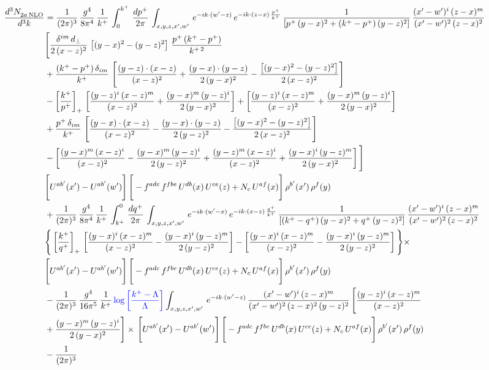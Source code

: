\documentclass[9pt]{article}
\numberwithin{equation}{section}
\begin{document}
\begin{align}
    \frac{d^{3}N_{2a\,\rm NLO}^{\rm}}{d^{3}k}  & =  \frac{1}{(2\pi)^{3}}\, \frac{g^{4}}{8\pi^{4}}\,\frac{1}{k^{+}}\,\int_{0}^{k^{+}}\, \frac{dp^{+}}{2\pi}\,\int_{x,y,z,x',w'}\, e^{-ik\cdot(w'-z)}\,e^{-ik\cdot (z-x)\,\frac{p^{+}}{k^{+}}}\,\frac{1}{\left[p^{+}\,(y-x)^{2}+(k^{+}-p^{+})\,(y-z)^{2}\right]}\, \frac{(x'-w')^{i}\,(z-x)^{m}}{(x'-w')^{2}\,(z-x)^{2}} \notag \\ & \Bigg[\frac{\delta^{im}\,d_{\perp}}{2\,(x-z)^{2}}\,\left[(y-x)^{2}-(y-z)^{2}\right]\,\frac{p^{+}\,(k^{+}-p^{+})}{k^{+\,2}}\notag \\ & +\frac{(k^{+}-p^{+})\,\delta_{im}}{k^{+}}\,\left[\frac{(y-z)\cdot (x-z)}{(x-z)^{2}}+\frac{(y-x)\cdot (y-z)}{2\,(y-x)^{2}}-\frac{\left[(y-x)^{2}-(y-z)^{2}\right]}{2\,(x-z)^{2}}\right]\notag \\ & -\left[\frac{k^{+}}{p^{+}}\right]_{+}\,\left[\frac{(y-z)^{i}\,(x-z)^{m}}{(x-z)^{2}}+\frac{(y-x)^{m}\,(y-z)^{i}}{2\,(y-x)^{2}}\right]+ \left[\frac{(y-z)^{i}\,(x-z)^{m}}{(x-z)^{2}}+\frac{(y-x)^{m}\,(y-z)^{i}}{2\,(y-x)^{2}}\right]\notag \\ & +\frac{p^{+}\,\delta_{im}}{k^{+}}\,\left[\frac{(y-x)\cdot (x-z)}{(x-z)^{2}}-\frac{(y-x)\cdot (y-z)}{2\,(y-z)^{2}}-\frac{\left[(y-x)^{2}-(y-z)^{2}\right]}{2\,(x-z)^{2}}\right]\notag \\ &-\left[\frac{(y-x)^{m}\,(x-z)^{i}}{(x-z)^{2}}-\frac{(y-x)^{m}\,(y-z)^{i}}{2\,(y-z)^{2}}+\frac{(y-z)^{m}\,(x-z)^{i}}{(x-z)^{2}}+\frac{(y-x)^{i}\,(y-z)^{m}}{2\,(y-x)^{2}}\right]\Bigg]\, \notag \\ & \Bigg[U^{ab'}(x')-U^{ab'}(w')\Bigg]\,\Bigg[-f^{adc}\,f^{fbe}\,U^{db}(x)\,U^{ce}(z)+N_{c}\,U^{af}(x)\Bigg]\,\rho^{b'}(x')\,\rho^{f}(y)\notag \\ & + \frac{1}{(2\pi)^{3}}\,\frac{g^{4}}{8\pi^{4}}\,\frac{1}{k^{+}}\, \int^{0}_{k^{+}}\, \frac{dq^{+}}{2\pi} \,  \int_{x,y,z,x',w'}\,e^{-ik\cdot(w'-x)}\,e^{-ik\cdot (x-z)\,\frac{q^{+}}{k^{+}}}\,\frac{1}{\left[(k^{+}-q^{+})\,(y-x)^{2}+q^{+}\,(y-z)^{2}\right]}\, \frac{(x'-w')^{i}\,(z-x)^{m}}{(x'-w')^{2}\,(z-x)^{2}} \notag \\ &\Bigg\{\left[\frac{k^{+}}{q^{+}}\right]_{+}\,\left[\frac{(y-x)^{i}\,(x-z)^{m}}{(x-z)^{2}}-\frac{(y-x)^{i}\,(y-z)^{m}}{2\,(y-z)^{2}}\right] -\left[\frac{(y-x)^{i}\,(x-z)^{m}}{(x-z)^{2}}-\frac{(y-x)^{i}\,(y-z)^{m}}{2\,(y-z)^{2}}\right]\Bigg\}\times\,\notag \\ & \Bigg[U^{ab'}(x')-U^{ab'}(w')\Bigg]\,\Bigg[-f^{adc}\,f^{fbe}\,U^{db}(x)\,U^{ce}(z)+N_{c}\,U^{af}(x)\Bigg]\,\rho^{b'}(x')\,\rho^{f}(y)\notag \\ & - \frac{1}{(2\pi)^{3}}\, \frac{g^{4}}{16\pi^{5}}\,\frac{1}{k^{+}}\,{\color{blue}\log{\left[\frac{k^{+}-\Lambda}{\Lambda}\right]}} \int_{x,y,z,x',w'}\,e^{-ik\cdot(w'-z)}\, \frac{(x'-w')^{i}\,(z-x)^{m}}{(x'-w')^{2}\,(z-x)^{2}\, (y-z)^{2}}\,\Bigg[\frac{(y-z)^{i}\,(x-z)^{m}}{(x-z)^{2}}\notag \\ & +\frac{(y-x)^{m}\,(y-z)^{i}}{2\,(y-x)^{2}}\Bigg]\times\, \Bigg[U^{ab'}(x')-U^{ab'}(w')\Bigg]\,\Bigg[-f^{adc}\,f^{fbe}\,U^{db}(x)\,U^{ce}(z)+N_{c}\,U^{af}(x)\Bigg]\,\rho^{b'}(x')\,\rho^{f}(y)\notag \\ & - \frac{1}{(2\pi)^{3}}\, 
\end{align}
\end{document}
